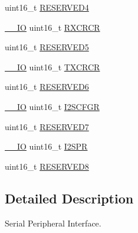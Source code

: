 \begin{DoxyCompactItemize}
\item 
uint16\-\_\-t \hyperlink{struct_s_p_i___type_def_a20e3ac1445ed1e7a9792ca492c46a73a}{R\-E\-S\-E\-R\-V\-E\-D4}
\item 
\hyperlink{group___c_m_s_i_s__core__definitions_gaec43007d9998a0a0e01faede4133d6be}{\-\_\-\-\_\-\-I\-O} uint16\-\_\-t \hyperlink{struct_s_p_i___type_def_ab53da6fb851d911ae0b1166be2cfe48a}{R\-X\-C\-R\-C\-R}
\item 
uint16\-\_\-t \hyperlink{struct_s_p_i___type_def_ab63440e38c7872a8ed11fb2d8d94714e}{R\-E\-S\-E\-R\-V\-E\-D5}
\item 
\hyperlink{group___c_m_s_i_s__core__definitions_gaec43007d9998a0a0e01faede4133d6be}{\-\_\-\-\_\-\-I\-O} uint16\-\_\-t \hyperlink{struct_s_p_i___type_def_a3c0c1be66bc0a1846274a7511f4a36f5}{T\-X\-C\-R\-C\-R}
\item 
uint16\-\_\-t \hyperlink{struct_s_p_i___type_def_a0870177921541602a44f744f1b66e823}{R\-E\-S\-E\-R\-V\-E\-D6}
\item 
\hyperlink{group___c_m_s_i_s__core__definitions_gaec43007d9998a0a0e01faede4133d6be}{\-\_\-\-\_\-\-I\-O} uint16\-\_\-t \hyperlink{struct_s_p_i___type_def_a20a4775ce461eec0d9a437bed464c0a5}{I2\-S\-C\-F\-G\-R}
\item 
uint16\-\_\-t \hyperlink{struct_s_p_i___type_def_a98df0a538eb077b2cfc5194eda200f1b}{R\-E\-S\-E\-R\-V\-E\-D7}
\item 
\hyperlink{group___c_m_s_i_s__core__definitions_gaec43007d9998a0a0e01faede4133d6be}{\-\_\-\-\_\-\-I\-O} uint16\-\_\-t \hyperlink{struct_s_p_i___type_def_aecee11b0d2e534b5243e9db6a0e10026}{I2\-S\-P\-R}
\item 
uint16\-\_\-t \hyperlink{struct_s_p_i___type_def_a0ffe762827b71caff20c75bf105387f6}{R\-E\-S\-E\-R\-V\-E\-D8}
\end{DoxyCompactItemize}


\subsection{Detailed Description}
Serial Peripheral Interface. 

